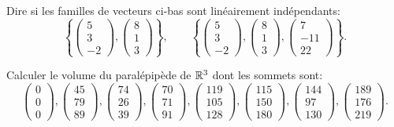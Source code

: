 \begin{exercice}
Dire si les familles de vecteurs ci-bas sont linéairement indépendants:
\[
\left\{
\left(\begin{matrix}5\\3\\-2\end{matrix}\right),
\left(\begin{matrix}8\\1\\3\end{matrix}\right)
\right\},\qquad
\left\{
\left(\begin{matrix}5\\3\\-2\end{matrix}\right),
\left(\begin{matrix}8\\1\\3\end{matrix}\right),
\left(\begin{matrix}7\\-11\\22\end{matrix}\right)
\right\}.
\]
\end{exercice}


\begin{exercice}
    Calculer le volume du paralépipède de $\mathbb{R}^3$ dont les sommets sont:
\[
\left(\begin{matrix}0\\0\\0\end{matrix}\right),
\left(\begin{matrix}45\\79\\89\end{matrix}\right),
\left(\begin{matrix}74\\26\\39\end{matrix}\right),
\left(\begin{matrix}70\\71\\91\end{matrix}\right),
\left(\begin{matrix}119\\105\\128\end{matrix}\right),
\left(\begin{matrix}115\\150\\180\end{matrix}\right),
\left(\begin{matrix}144\\97\\130\end{matrix}\right),
\left(\begin{matrix}189\\176\\219\end{matrix}\right).
\]
\end{exercice}


